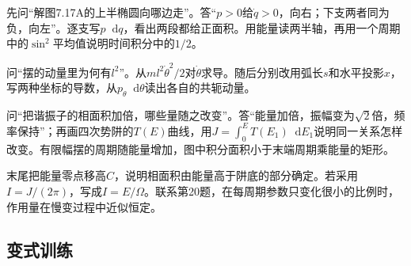 \documentclass[UTF8,fontset=fandol,a4paper,11pt]{ctexart}
\newcommand{\dd}{\mathop{}\!\mathrm{d}}
\begin{document}
先问“解图7.17A的上半椭圆向哪边走”。答“$p>0$给$\dot q>0$，向右；下支两者同为负，向左”。逐支写$p\dd q$，看出两段都给正面积。用能量读两半轴，再用一个周期中的$\sin^2$平均值说明时间积分中的$1/2$。

问“摆的动量里为何有$l^2$”。从$ml^2\dot\theta^2/2$对$\dot\theta$求导。随后分别改用弧长$s$和水平投影$x$，写两种坐标的导数，从$p_\theta\dd\theta$读出各自的共轭动量。

问“把谐振子的相面积加倍，哪些量随之改变”。答“能量加倍，振幅变为$\sqrt2$倍，频率保持”；再画四次势阱的$T(E)$曲线，用$J=\int_0^E T(E_1)\dd E_1$说明同一关系怎样改变。有限幅摆的周期随能量增加，图中积分面积小于末端周期乘能量的矩形。

末尾把能量零点移高$C$，说明相面积由能量高于阱底的部分确定。若采用$I=J/(2\pi)$，写成$I=E/\Omega$。联系第20题，在每周期参数只变化很小的比例时，作用量在慢变过程中近似恒定。



\subsection*{变式训练}
\end{document}
